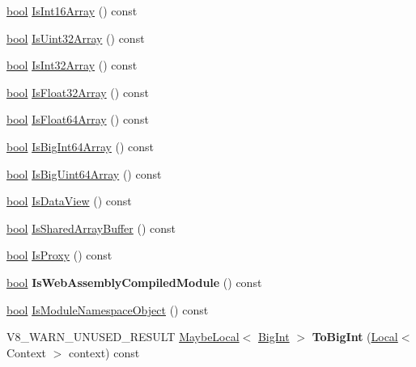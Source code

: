 \begin{DoxyCompactItemize}
\item 
\mbox{\hyperlink{classbool}{bool}} \mbox{\hyperlink{classv8_1_1Value_a8db779f4ac104540e63d78e73d424195}{Is\+Int16\+Array}} () const
\item 
\mbox{\hyperlink{classbool}{bool}} \mbox{\hyperlink{classv8_1_1Value_a52fe549df18b0c77a875d7aa61f87317}{Is\+Uint32\+Array}} () const
\item 
\mbox{\hyperlink{classbool}{bool}} \mbox{\hyperlink{classv8_1_1Value_afd14729579f9768a7d3f8bc3db6c1d28}{Is\+Int32\+Array}} () const
\item 
\mbox{\hyperlink{classbool}{bool}} \mbox{\hyperlink{classv8_1_1Value_aafedbffb06cdd267149f241ad7926d9d}{Is\+Float32\+Array}} () const
\item 
\mbox{\hyperlink{classbool}{bool}} \mbox{\hyperlink{classv8_1_1Value_a7ed4de7b1d4467cdd69eb128b3ecfdf2}{Is\+Float64\+Array}} () const
\item 
\mbox{\hyperlink{classbool}{bool}} \mbox{\hyperlink{classv8_1_1Value_a2a4c67e98ddf7b09060e226130f25fda}{Is\+Big\+Int64\+Array}} () const
\item 
\mbox{\hyperlink{classbool}{bool}} \mbox{\hyperlink{classv8_1_1Value_a8a65d3cc71eebd50fa5cdc02fa2198f0}{Is\+Big\+Uint64\+Array}} () const
\item 
\mbox{\hyperlink{classbool}{bool}} \mbox{\hyperlink{classv8_1_1Value_ad854ff95b445e924a4d78b1b1dc8054b}{Is\+Data\+View}} () const
\item 
\mbox{\hyperlink{classbool}{bool}} \mbox{\hyperlink{classv8_1_1Value_a1d7d90fe704feab89dcbdc383ab298b2}{Is\+Shared\+Array\+Buffer}} () const
\item 
\mbox{\hyperlink{classbool}{bool}} \mbox{\hyperlink{classv8_1_1Value_a3c0ad01f2ca4ac050ef8214785848918}{Is\+Proxy}} () const
\item 
\mbox{\label{classv8_1_1Value_afca9fc3c0149433e8df15317d2b15590}} 
\mbox{\hyperlink{classbool}{bool}} {\bfseries Is\+Web\+Assembly\+Compiled\+Module} () const
\item 
\mbox{\hyperlink{classbool}{bool}} \mbox{\hyperlink{classv8_1_1Value_aa6c9cb065da30b0b58b929ecaa80a1ab}{Is\+Module\+Namespace\+Object}} () const
\item 
\mbox{\label{classv8_1_1Value_a30b941d80653ee13b9f8bb66a8410c29}} 
V8\+\_\+\+W\+A\+R\+N\+\_\+\+U\+N\+U\+S\+E\+D\+\_\+\+R\+E\+S\+U\+LT \mbox{\hyperlink{classv8_1_1MaybeLocal}{Maybe\+Local}}$<$ \mbox{\hyperlink{classv8_1_1BigInt}{Big\+Int}} $>$ {\bfseries To\+Big\+Int} (\mbox{\hyperlink{classv8_1_1Local}{Local}}$<$ Context $>$ context) const

\end{DoxyCompactItemize}
